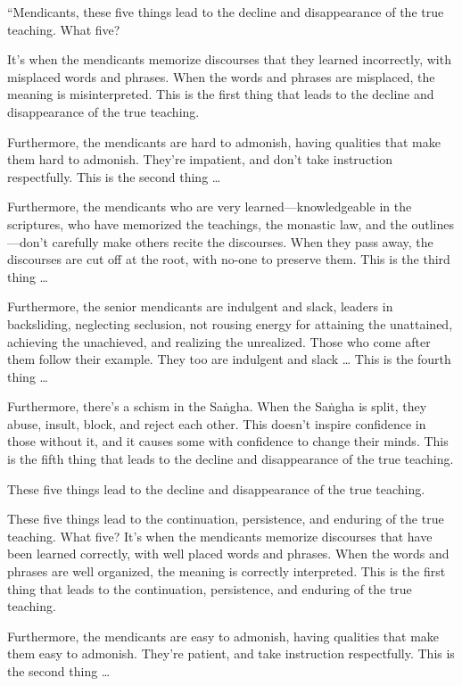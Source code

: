 \documentclass[12pt,openany]{book}%
\begin{document}
“Mendicants, these five things lead to the decline and disappearance of the true teaching. What five? 

It’s when the mendicants memorize discourses that they learned incorrectly, with misplaced words and phrases. When the words and phrases are misplaced, the meaning is misinterpreted. This is the first thing that leads to the decline and disappearance of the true teaching. 

Furthermore, the mendicants are hard to admonish, having qualities that make them hard to admonish. They’re impatient, and don’t take instruction respectfully. This is the second thing … 

Furthermore, the mendicants who are very learned—knowledgeable in the scriptures, who have memorized the teachings, the monastic law, and the outlines—don’t carefully make others recite the discourses. When they pass away, the discourses are cut off at the root, with no-one to preserve them. This is the third thing … 

Furthermore, the senior mendicants are indulgent and slack, leaders in backsliding, neglecting seclusion, not rousing energy for attaining the unattained, achieving the unachieved, and realizing the unrealized. Those who come after them follow their example. They too are indulgent and slack … This is the fourth thing … 

Furthermore, there’s a schism in the \textsanskrit{Saṅgha}. When the \textsanskrit{Saṅgha} is split, they abuse, insult, block, and reject each other. This doesn’t inspire confidence in those without it, and it causes some with confidence to change their minds. This is the fifth thing that leads to the decline and disappearance of the true teaching. 

These five things lead to the decline and disappearance of the true teaching. 

These five things lead to the continuation, persistence, and enduring of the true teaching. What five? It’s when the mendicants memorize discourses that have been learned correctly, with well placed words and phrases. When the words and phrases are well organized, the meaning is correctly interpreted. This is the first thing that leads to the continuation, persistence, and enduring of the true teaching. 

Furthermore, the mendicants are easy to admonish, having qualities that make them easy to admonish. They’re patient, and take instruction respectfully. This is the second thing … 
\end{document}
